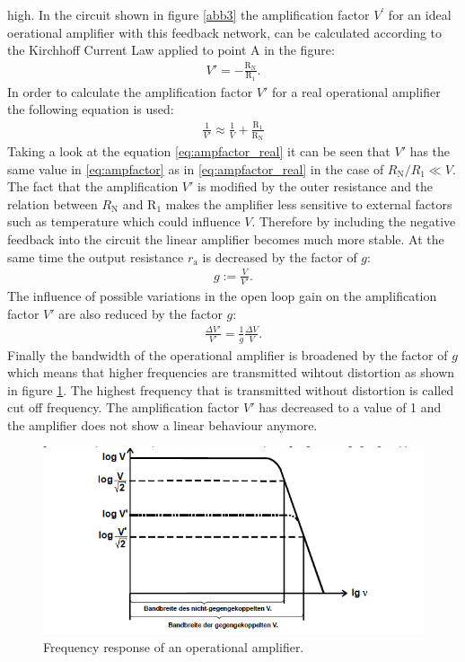 high.
In the circuit shown in figure \ref{abb3} the amplification factor $V^{\prime}$ for an ideal
oerational amplifier with this feedback network, can be calculated according to the Kirchhoff Current Law
applied to point A in the figure:
\begin{align}
    V'=-\frac{\text{R}_{\text{N}}}{\text{R}_1}.
    \label{eq:ampfactor}
\end{align}
In order to calculate the amplification factor $V'$ for a real operational amplifier
the following equation is used:
\begin{align}
    \frac{1}{V'} \approx \frac{1}{V} + \frac{\text{R}_1}{\text{R}_{\text{N}}}
    \label{eq:ampfactor_real}
\end{align}
Taking a look at the equation \ref{eq:ampfactor_real} it can be seen that $V'$ has
the same value in \ref{eq:ampfactor} as in \ref{eq:ampfactor_real} in the case of
$R_{\text{N}}/R_1 \ll V$.
The fact that the amplification $V'$ is modified by the outer resistance and the
relation between $R_{\text{N}}$ and $\text{R}_1$ makes the amplifier less sensitive to
external factors such as temperature which could influence $V$.
Therefore by including the negative feedback into the circuit the linear amplifier becomes
much more stable.
At the same time the output resistance $r_{\text{a}}$ is decreased by the factor
of $g$:
\begin{align*}
    g:= \frac{V}{V'}.
\end{align*}
The influence of possible variations in the open loop gain on the amplification
factor $V'$ are also reduced by the factor $g$:
\begin{align*}
    \frac{\Delta V'}{V'}=\frac{1}{g}\frac{\Delta V}{V}.
\end{align*}
Finally the bandwidth of the operational amplifier is broadened by the factor of
$g$ which means that higher frequencies are transmitted wihtout distortion as shown
in figure \ref{abb4}. The highest frequency that is transmitted without distortion
is called cut off frequency. The amplification factor $V'$ has decreased to a value of
1 and the amplifier does not show a linear behaviour anymore.
\FloatBarrier
\begin{figure}
  \centering
  \includegraphics[scale=0.5]{bandwidth.PNG}
  \caption{Frequency response of an operational amplifier. \cite{Q1}}
  \label{abb4}
\end{figure}
\FloatBarrier

